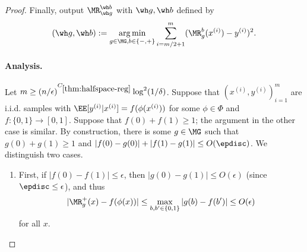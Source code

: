 \begin{proof}
Finally, output $\MR_{\wh g}^{\wh b}$ with $\wh g, \wh b$ defined by
\[(\wh g, \wh b) := \argmin_{g \in \MG, b \in \{-,+\}} \sum_{i=m/2+1}^m (\MR_g^b(x^{(i)}) - y^{(i)})^2.\]

\paragraph{Analysis.} Let $m \geq (n/\epsilon)^{C_{\ref{thm:halfspace-reg}}} \log^2(1/\delta)$. Suppose that $(x^{(i)},y^{(i)})_{i=1}^m$ are i.i.d. samples with $\EE[y^{(i)}|x^{(i)}] = f(\phi(x^{(i)}))$ for some $\phi \in \Phi$ and $f: \{0,1\} \to [0,1]$. Suppose that $f(0) + f(1) \geq 1$; the argument in the other case is similar. By construction, there is some $g \in \MG$ such that $g(0) + g(1) \geq 1$ and $|f(0)-g(0)| + |f(1)-g(1)| \leq O(\epdisc)$. We distinguish two cases. 
\begin{enumerate}
    \item First, if $|f(0) - f(1)| \leq \epsilon$, then $|g(0) - g(1)| \leq O(\epsilon)$ (since $\epdisc \leq \epsilon$), and thus \[|\MR_g^+(x) - f(\phi(x))| \leq \max_{b,b'\in\{0,1\}} |g(b) - f(b')| \leq O(\epsilon)\] for all $x$.


\end{enumerate}
\end{proof}

